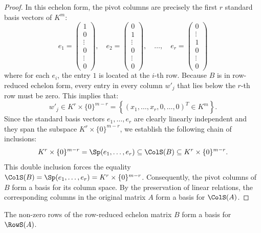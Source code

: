 \begin{proof}
In this echelon form, the pivot columns are precisely the first $r$ standard basis vectors of $K^m$:
\[
e_1 = \begin{pmatrix} 1 \\ 0 \\ \vdots \\ 0 \\ \vdots \\ 0 \end{pmatrix}, \quad 
e_2 = \begin{pmatrix} 0 \\ 1 \\ \vdots \\ 0 \\ \vdots \\ 0 \end{pmatrix}, \quad \dots, \quad 
e_r = \begin{pmatrix} 0 \\ \vdots \\ 1 \\ 0 \\ \vdots \\ 0 \end{pmatrix}
\]
where for each $e_i$, the entry $1$ is located at the $i$-th row. Because $B$ is in row-reduced echelon form, every entry in every column $w'_j$ that lies below the $r$-th row must be zero. This implies that:
\[
w'_j \in K^r \times \{0\}^{m-r} = \left\{ (x_1, \dots, x_r, 0, \dots, 0)^{T} \in K^m \right\}.
\]
Since the standard basis vectors $e_1, \dots, e_r$ are clearly linearly independent and they span the subspace $K^r \times \{0\}^{m-r}$, we establish the following chain of inclusions:
\[
K^r \times \{0\}^{m-r} = \Sp(e_1, \dots, e_r) \subseteq \ColS(B) \subseteq K^r \times \{0\}^{m-r}.
\]
This double inclusion forces the equality $\ColS(B) = \Sp(e_1, \dots, e_r) = K^r \times \{0\}^{m-r}$. Consequently, the pivot columns of $B$ form a basis for its column space. By the preservation of linear relations, the corresponding columns in the original matrix $A$ form a basis for $\ColS(A)$.
\end{proof}

\begin{theorem}
\label{thm:row_basis}
The non-zero rows of the row-reduced echelon matrix $B$ form a basis for $\RowS(A)$.
\end{theorem}

